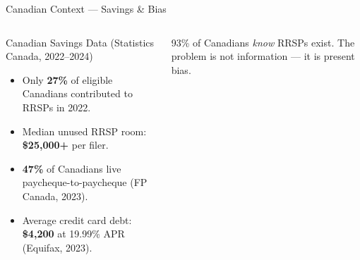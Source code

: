 \documentclass[aspectratio=169]{beamer}
\begin{document}
\begin{frame}{Canadian Context --- Savings \& Bias}
\begin{columns}
\begin{block}{Canadian Savings Data (Statistics Canada, 2022--2024)}
\begin{itemize}
  \item Only \textbf{27\%} of eligible Canadians contributed to RRSPs in 2022.
  \item Median unused RRSP room: \textbf{\$25{,}000+} per filer.
  \item \textbf{47\%} of Canadians live paycheque-to-paycheque (FP Canada, 2023).
  \item Average credit card debt: \textbf{\$4{,}200} at 19.99\% APR (Equifax, 2023).
\end{itemize}
\end{block}
\begin{exampleblock}{}
93\% of Canadians \textit{know} RRSPs exist. The problem is not information --- it is \alert{present bias}.
\end{exampleblock}
\end{columns}
\end{frame}
\end{document}
